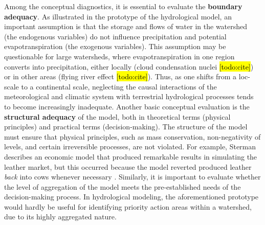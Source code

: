 \documentclass[./main_en.tex]{subfiles}
\begin{document}
\par Among the conceptual diagnostics, it is essential to evaluate the \textbf{boundary adequacy}. As illustrated in the prototype of the hydrological \gls{model}, an important assumption is that the storage and flows of water in the watershed (the endogenous variables) do not influence precipitation and potential evapotranspiration (the exogenous variables). This assumption may be questionable for large watersheds, where evapotranspiration in one region converts into precipitation, either locally (cloud condensation nuclei \hl{[todo:cite]}) or in other areas (flying river effect \hl{[todo:cite]}). Thus, as one shifts from a \gls{loc-scale} to a continental scale, neglecting the causal interactions of the meteorological and climatic \gls{system} with terrestrial hydrological processes tends to become increasingly inadequate. Another basic conceptual evaluation is the \textbf{structural adequacy} of the \gls{model}, both in theoretical terms (physical principles) and practical terms (decision-making). The structure of the \gls{model} must ensure that physical principles, such as mass conservation, non-negativity of levels, and certain irreversible processes, are not violated. For example, Sterman describes an economic \gls{model} that produced remarkable results in simulating the leather market, but this occurred because the \gls{model} reverted produced leather \textit{back} into cows whenever necessary \cite{sterman2000}. Similarly, it is important to evaluate whether the level of aggregation of the \gls{model} meets the pre-established needs of the decision-making process. In hydrological modeling, the aforementioned prototype would hardly be useful for identifying priority action areas within a watershed, due to its highly aggregated nature.
 
\end{document}
